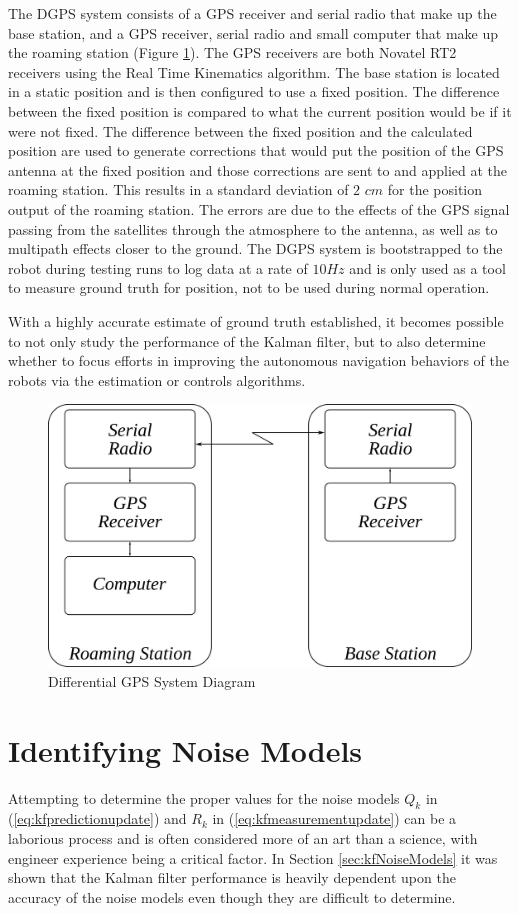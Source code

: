 The DGPS system consists of a GPS receiver and serial radio that make up the base station, and a GPS receiver, serial radio and small computer that make up the roaming station (Figure \ref{fig:dgps}). The GPS receivers are both Novatel RT2 receivers using the Real Time Kinematics algorithm. The base station is located in a static position and is then configured to use a fixed position. The difference between the fixed position is compared to what the current position would be if it were not fixed. The difference between the fixed position and the calculated position are used to generate corrections that would put the position of the GPS antenna at the fixed position and those corrections are sent to and applied at the roaming station. This results in a standard deviation of $2$ $cm$ for the position output of the roaming station. The errors are due to the effects of the GPS signal passing from the satellites through the atmosphere to the antenna, as well as to multipath effects closer to the ground. The DGPS system is bootstrapped to the robot during testing runs to log data at a rate of $10 Hz$ and is only used as a tool to measure ground truth for position, not to be used during normal operation.

With a highly accurate estimate of ground truth established, it becomes possible to not only study the performance of the Kalman filter, but to also determine whether to focus efforts in improving the autonomous navigation behaviors of the robots via the estimation or controls algorithms.

\begin{figure}[ht!]
	\centering
	\includegraphics[width=.6\textwidth]{images/dgps}
	\caption{Differential GPS System Diagram}
	\label{fig:dgps}
\end{figure}

\section{Identifying Noise Models}
\label{sec:kfIdentifyNoiseModels}
Attempting to determine the proper values for the noise models $Q_k$ in (\ref{eq:kfpredictionupdate}) and $R_k$ in (\ref{eq:kfmeasurementupdate}) can be a laborious process and is often considered more of an art than a science, with engineer experience being a critical factor. In Section \ref{sec:kfNoiseModels} it was shown that the Kalman filter performance is heavily dependent upon the accuracy of the noise models even though they are difficult to determine.

